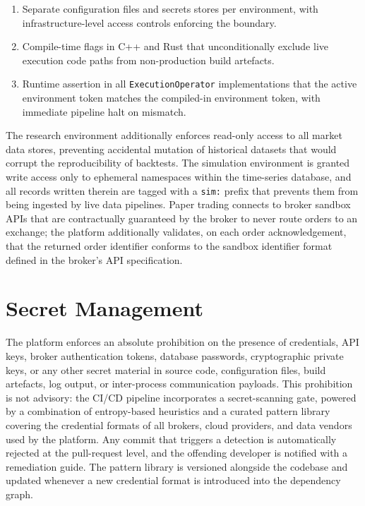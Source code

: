 \documentclass[12pt,openany]{book}
\numberwithin{equation}{chapter}
\theoremstyle{plain}
\theoremstyle{definition}
\theoremstyle{remark}
\begin{document}
\begin{enumerate}
    \item Separate configuration files and secrets stores per environment, with infrastructure-level access controls enforcing the boundary.
    \item Compile-time flags in C++ and Rust that unconditionally exclude live execution code paths from non-production build artefacts.
    \item Runtime assertion in all \texttt{ExecutionOperator} implementations that the active environment token matches the compiled-in environment token, with immediate pipeline halt on mismatch.
\end{enumerate}

The research environment additionally enforces read-only access to all market data stores, preventing accidental mutation of historical datasets that would corrupt the reproducibility of backtests. The simulation environment is granted write access only to ephemeral namespaces within the time-series database, and all records written therein are tagged with a \texttt{sim:} prefix that prevents them from being ingested by live data pipelines. Paper trading connects to broker sandbox APIs that are contractually guaranteed by the broker to never route orders to an exchange; the platform additionally validates, on each order acknowledgement, that the returned order identifier conforms to the sandbox identifier format defined in the broker's API specification.

\section{Secret Management}

The platform enforces an absolute prohibition on the presence of credentials, API keys, broker authentication tokens, database passwords, cryptographic private keys, or any other secret material in source code, configuration files, build artefacts, log output, or inter-process communication payloads. This prohibition is not advisory: the CI/CD pipeline incorporates a secret-scanning gate, powered by a combination of entropy-based heuristics and a curated pattern library covering the credential formats of all brokers, cloud providers, and data vendors used by the platform. Any commit that triggers a detection is automatically rejected at the pull-request level, and the offending developer is notified with a remediation guide. The pattern library is versioned alongside the codebase and updated whenever a new credential format is introduced into the dependency graph.
\end{document}
